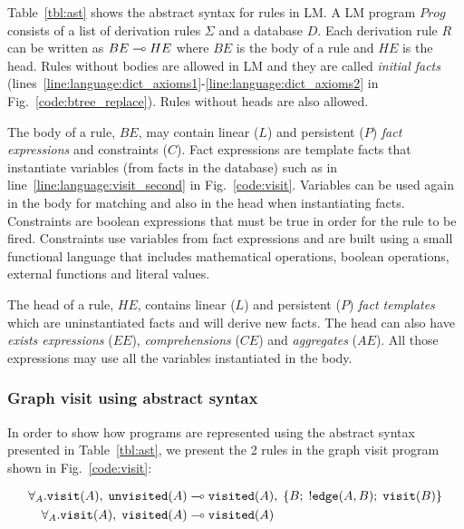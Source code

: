 Table~\ref{tbl:ast} shows the abstract syntax for rules in LM.  A LM program
$Prog$ consists of a list of derivation rules $\Sigma$ and a database $D$.  Each
derivation rule $R$ can be written as $BE \multimap HE$ where $BE$ is the body of a
rule and $HE$ is the head. Rules without bodies are allowed in LM and they are
called \emph{initial facts}
(lines~\ref{line:language:dict_axioms1}-\ref{line:language:dict_axioms2} in
Fig.~\ref{code:btree_replace}). Rules without heads are also allowed.

The body of a rule, $BE$, may contain linear ($L$) and persistent ($P$)
\emph{fact expressions} and constraints ($C$). Fact expressions are template
facts that instantiate variables (from facts in the database) such as
 in line~\ref{line:language:visit_second} in
Fig.~\ref{code:visit}. Variables can be used again in the body for matching and
also in the head when instantiating facts.  Constraints are boolean expressions
that must be true in order for the rule to be fired. Constraints use variables
from fact expressions and are built using a small functional language that
includes mathematical operations, boolean operations, external functions and
literal values.

The head of a rule, $HE$, contains linear ($L$) and persistent ($P$) \emph{fact
templates} which are uninstantiated facts and will derive new facts. The head
can also have \emph{exists expressions} ($EE$), \emph{comprehensions} ($CE$)
and \emph{aggregates} ($AE$). All those expressions may use all the variables
instantiated in the body.

\subsubsection{Graph visit using abstract syntax}\label{visit:ast}

In order to show how programs are represented using the abstract syntax
presented in Table~\ref{tbl:ast}, we present the 2 rules in the graph visit
program shown in Fig.~\ref{code:visit}:

\nopagebreak

\begin{align}
\forall_A. \mathtt{visit}(A), \; \mathtt{unvisited}(A) \multimap & \;
\mathtt{visited}(A), \; \{ B; \; {!} \mathtt{edge}(A, B); \;
\mathtt{visit}(B)\}\\
\forall_A. \mathtt{visit}(A), \; \mathtt{visited}(A) \multimap & \;
\mathtt{visited}(A)
\end{align}

